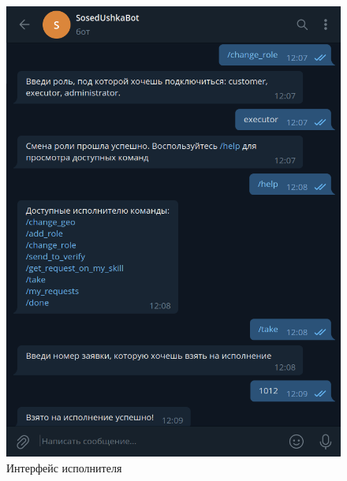 \begin{figure}[H]
	\begin{center}
		\includegraphics[scale=0.3]{assets/executor.png}
	\end{center}
	\caption{Интерфейс исполнителя}
	\label{executor}
\end{figure}


